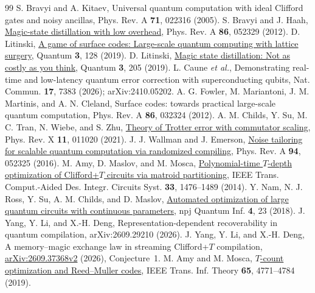 \documentclass[aps,prx,twocolumn,superscriptaddress,nofootinbib,longbibliography]{revtex4-2}
\theoremstyle{plain}
\theoremstyle{definition}
\theoremstyle{remark}
\begin{document}
\begin{thebibliography}{99}
 S. Bravyi and A. Kitaev, Universal quantum computation with ideal Clifford gates and noisy ancillas, Phys. Rev. A \textbf{71}, 022316 (2005).
 S. Bravyi and J. Haah, \href{https://doi.org/10.1103/PhysRevA.86.052329}{Magic-state distillation with low overhead}, Phys. Rev. A \textbf{86}, 052329 (2012).
 D. Litinski, \href{https://doi.org/10.22331/q-2019-03-05-128}{A game of surface codes: Large-scale quantum computing with lattice surgery}, Quantum \textbf{3}, 128 (2019).
 D. Litinski, \href{https://doi.org/10.22331/q-2019-12-02-205}{Magic state distillation: Not as costly as you think}, Quantum \textbf{3}, 205 (2019).
 L. Caune \emph{et al.}, Demonstrating real-time and low-latency quantum error correction with superconducting qubits, Nat. Commun. \textbf{17}, 7383 (2026); arXiv:2410.05202.
 A. G. Fowler, M. Mariantoni, J. M. Martinis, and A. N. Cleland, Surface codes: towards practical large-scale quantum computation, Phys. Rev. A \textbf{86}, 032324 (2012).
 A. M. Childs, Y. Su, M. C. Tran, N. Wiebe, and S. Zhu, \href{https://doi.org/10.1103/PhysRevX.11.011020}{Theory of Trotter error with commutator scaling}, Phys. Rev. X \textbf{11}, 011020 (2021).
 J. J. Wallman and J. Emerson, \href{https://doi.org/10.1103/PhysRevA.94.052325}{Noise tailoring for scalable quantum computation via randomized compiling}, Phys. Rev. A \textbf{94}, 052325 (2016).
 M. Amy, D. Maslov, and M. Mosca, \href{https://doi.org/10.1109/TCAD.2014.2341953}{Polynomial-time $T$-depth optimization of Clifford+$T$ circuits via matroid partitioning}, IEEE Trans. Comput.-Aided Des. Integr. Circuits Syst. \textbf{33}, 1476--1489 (2014).
 Y. Nam, N. J. Ross, Y. Su, A. M. Childs, and D. Maslov, \href{https://doi.org/10.1038/s41534-018-0072-4}{Automated optimization of large quantum circuits with continuous parameters}, npj Quantum Inf. \textbf{4}, 23 (2018).
 J. Yang, Y. Li, and X.-H. Deng, Representation-dependent recoverability in quantum compilation, arXiv:2609.29210 (2026).
 J. Yang, Y. Li, and X.-H. Deng, A memory--magic exchange law in streaming Clifford+$T$ compilation, \href{https://arxiv.org/abs/2609.37368v2}{arXiv:2609.37368v2} (2026), Conjecture~1.
 M. Amy and M. Mosca, \href{https://doi.org/10.1109/TIT.2019.2906374}{$T$-count optimization and Reed--Muller codes}, IEEE Trans. Inf. Theory \textbf{65}, 4771--4784 (2019).

\end{thebibliography}
\end{document}
